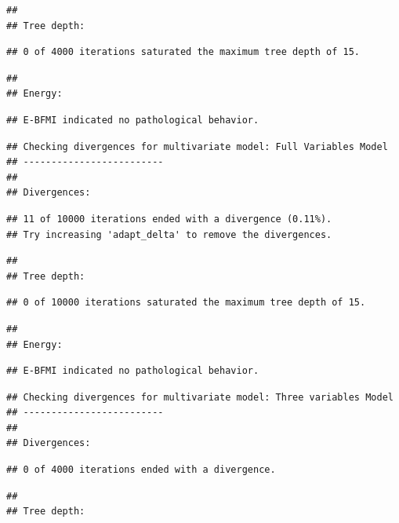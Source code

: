 \documentclass[
]{article}
\begin{document}
\begin{verbatim}
## 
## Tree depth:
\end{verbatim}

\begin{verbatim}
## 0 of 4000 iterations saturated the maximum tree depth of 15.
\end{verbatim}

\begin{verbatim}
## 
## Energy:
\end{verbatim}

\begin{verbatim}
## E-BFMI indicated no pathological behavior.
\end{verbatim}

\begin{verbatim}
## Checking divergences for multivariate model: Full Variables Model 
## -------------------------
## 
## Divergences:
\end{verbatim}

\begin{verbatim}
## 11 of 10000 iterations ended with a divergence (0.11%).
## Try increasing 'adapt_delta' to remove the divergences.
\end{verbatim}

\begin{verbatim}
## 
## Tree depth:
\end{verbatim}

\begin{verbatim}
## 0 of 10000 iterations saturated the maximum tree depth of 15.
\end{verbatim}

\begin{verbatim}
## 
## Energy:
\end{verbatim}

\begin{verbatim}
## E-BFMI indicated no pathological behavior.
\end{verbatim}

\begin{verbatim}
## Checking divergences for multivariate model: Three variables Model 
## -------------------------
## 
## Divergences:
\end{verbatim}

\begin{verbatim}
## 0 of 4000 iterations ended with a divergence.
\end{verbatim}

\begin{verbatim}
## 
## Tree depth:
\end{verbatim}
\end{document}
